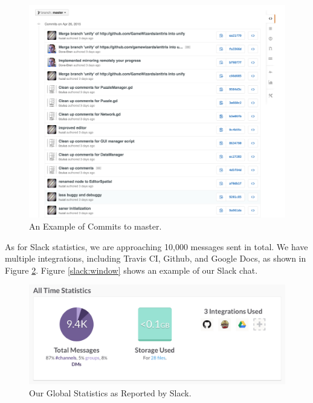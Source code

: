 \documentclass[12pt]{article}
\begin{document}
\begin{figure}[H]
        \centering
        \includegraphics[width=4.5in]{commitsexample.png}
        \caption{An Example of Commits to master.}\label{code:commits}
\end{figure}

As for Slack statistics, we are approaching 10,000 messages sent in total. We have multiple integrations, including Travis CI, Github, and Google Docs, as shown in Figure \ref{slack:stats}. Figure \ref{slack:window} shows an example of our Slack chat. 

\begin{figure}[H]
        \centering
        \includegraphics[width=4.5in]{slack.png}
        \caption{Our Global Statistics as Reported by Slack.}\label{slack:stats}
\end{figure}
\end{document}
